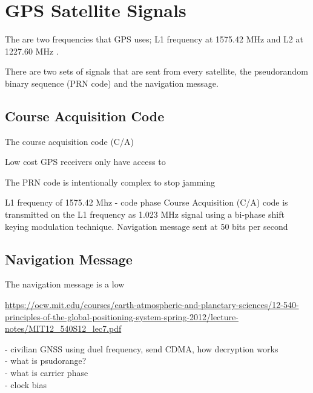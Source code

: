 
\section{GPS Satellite Signals}
The are two frequencies that GPS uses; L1 frequency at 1575.42 MHz and L2 at 1227.60 MHz \cite{postprocessing multi}.

There are two sets of signals that are sent from every satellite, the pseudorandom binary sequence (PRN code) and the navigation message.

\subsection{Course Acquisition Code}
The course acquisition code (C/A) 

Low cost GPS receivers only have access to 

The PRN code is intentionally complex to stop jamming 

L1 frequency of 1575.42 Mhz  - code phase
Course Acquisition (C/A) code is transmitted on the L1 frequency as 1.023 MHz signal using a bi-phase shift keying modulation technique.
Navigation message sent at 50 bits per second  


\subsection{Navigation Message}
The navigation message is a low 

\url{https://ocw.mit.edu/courses/earth-atmospheric-and-planetary-sciences/12-540-principles-of-the-global-positioning-system-spring-2012/lecture-notes/MIT12_540S12_lec7.pdf}

- civilian GNSS using duel frequency, send CDMA, how decryption works\\
- what is psudorange?\\
- what is carrier phase\\
- clock bias\\

